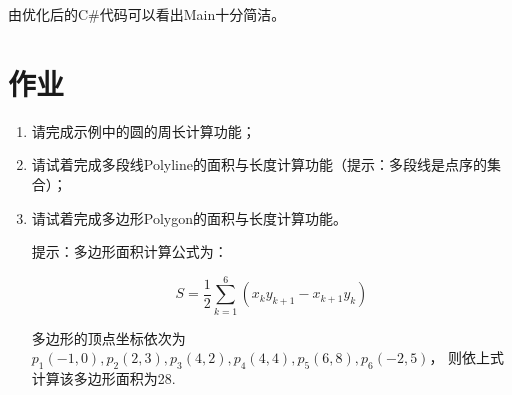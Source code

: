 

由优化后的C\#代码可以看出Main十分简洁。

\section{作业}
\begin{enumerate}
\item 请完成示例中的圆的周长计算功能；
\item 请试着完成多段线Polyline的面积与长度计算功能（提示：多段线是点序的集合）；
\item 请试着完成多边形Polygon的面积与长度计算功能。

提示：多边形面积计算公式为：

$$S=\frac{1}{2}\sum_{k=1}^{6}{(x_k y_{k+1} - x_{k+1} y_k)}$$

多边形的顶点坐标依次为
$p_1(-1,0), p_2(2,3), p_3(4,2), p_4(4,4),p_5(6,8),p_6(-2,5)$，
则依上式计算该多边形面积为28.
\end{enumerate}

